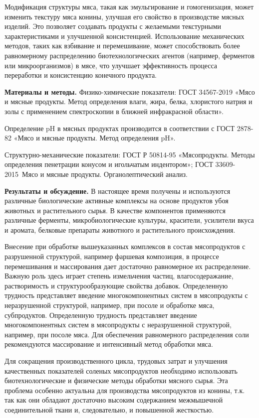 Модификация структуры мяса, такая как эмульгирование и гомогенизация,
может изменить текстуру мяса конины, улучшая его свойство в производстве
мясных изделий. Это позволяет создавать продукты с желаемыми текстурными
характеристиками и улучшенной консистенцией. Использование механических
методов, таких как взбивание и перемешивание, может способствовать более
равномерному распределению биотехнологических агентов (например,
ферментов или микроорганизмов) в мясе, что улучшает эффективность
процесса переработки и консистенцию конечного продукта.

{\bfseries Материалы и методы.} Физико-химические показатели: ГОСТ
34567-2019 «Мясо и мясные продукты. Метод определения влаги, жира,
белка, хлористого натрия и золы с применением спектроскопии в ближней
инфракрасной области».

Определение pH в мясных продуктах производится в соответствии с ГОСТ
2878-82 «Мясо и мясные продукты. Метод определения pH».

Структурно-механические показатели: ГОСТ Р 50814-95 «Мясопродукты.
Методы определения пенетрации конусом и игольчатым индентором»; ГОСТ
33609-2015~Мясо и мясные продукты. Органолептический анализ.

{\bfseries Результаты и обсуждение.} В настоящее время получены и
используются различные биологические активные комплексы на основе
продуктов убоя животных и растительного сырья. В качестве компонентов
применяются различные ферменты, микробиологические культуры, красители,
усилители вкуса и аромата, белковые препараты животного и растительного
происхождения.

Внесение при обработке вышеуказанных комплексов в состав мясопродуктов с
разрушенной структурой, например фаршевая композиция, в процессе
перемешивания и массирования дает достаточно равномерное их
распределение. Важную роль здесь играет степень измельчения частиц,
влагосодеражание, растворимость и структурообразующие свойства добавок.
Определенную трудность представляет введение многокомпонентных систем в
мясопродукты с неразрушенной структурой, например, при посоле и
обработке мяса, субпродуктов. Определенную трудность представляет
введение многокомпонентных систем в мясопродукты с неразрушенной
структурой, например, при посоле мяса. Для обеспечения равномерного
распределения соли рекомендуются массирование и интенсивный метод
обработки мяса.

Для сокращения производственного цикла, трудовых затрат и улучшения
качественных показателей соленых мясопродуктов необходимо использовать
биотехнологические и физические методы обработки мясного сырья. Эта
проблема особенно актуальна для производства мясопродуктов из конины,
т.к. так как они обладают достаточно высоким содержанием межмышечной
соединительной ткани и, следовательно, и повышенной жесткостью.

